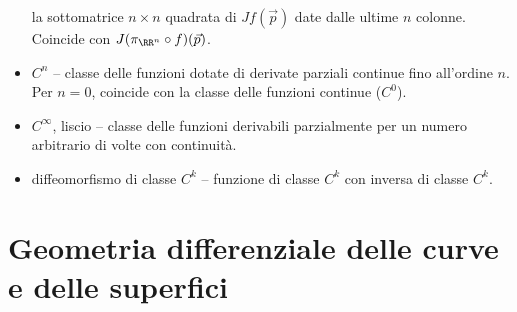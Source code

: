 \begin{multicols*}{2}
\begin{itemize}
                  la sottomatrice $n \times n$ quadrata di $J f(\vec{p})$ date dalle ultime $n$ colonne. Coincide
                  con $J (\pi_{\RR^n} \circ f)(\vec{p})$.
            \item $C^n$ -- classe delle funzioni dotate di derivate parziali continue fino all'ordine $n$. Per $n = 0$, coincide con la classe delle funzioni continue ($C^0$).
            \item $C^\infty$, liscio -- classe delle funzioni derivabili parzialmente per un numero arbitrario di volte con continuità.
            \item diffeomorfismo di classe $C^k$ -- funzione di classe $C^k$ con inversa di classe $C^k$.
      \end{itemize}

      \section*{Geometria differenziale delle curve e delle superfici}


\end{multicols*}
